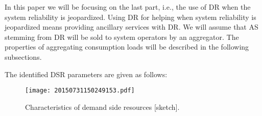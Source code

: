 In this paper we will be focusing on the last part, i.e., the use of DR when the system reliability is jeopardized. Using DR for helping when system reliability is jeopardized means providing ancillary services with DR. We will assume that AS stemming from DR will be sold to system operators by an aggregator. The properties of aggregating consumption loads will be described in the following subsections.

The identified DSR parameters are given as follows:
\begin{figure}[htb!]
\centering
\texttt{[image: 20150731150249153.pdf]}
\caption{Characteristics of demand side resources [sketch].}
\label{fig:resourcecharacteristics}
\end{figure}

